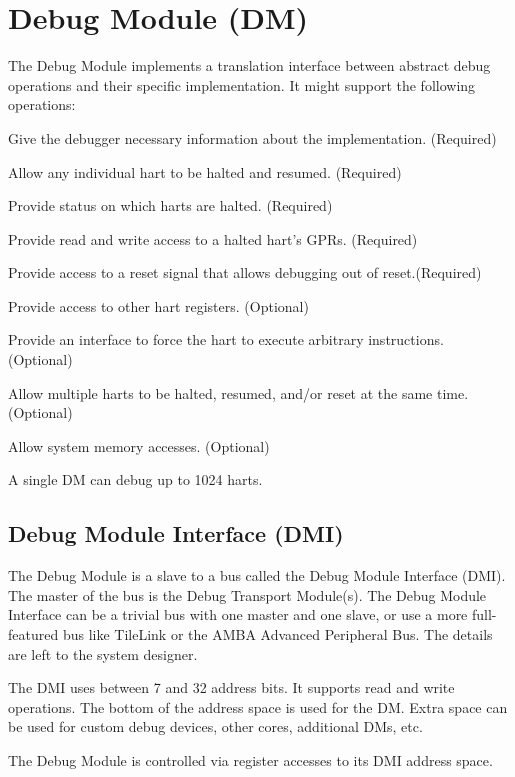 
\chapter{Debug Module (DM)} \label{dm}

\begin{steps}{The Debug Module implements a translation interface between abstract debug
    operations and their specific implementation. It might support the following
    operations:}
\item Give the debugger necessary information about the implementation. (Required)
\item Allow any individual hart to be halted and resumed. (Required)
\item Provide status on which harts are halted. (Required)
\item Provide read and write access to a halted hart's GPRs. (Required)
\item Provide access to a reset signal that allows debugging out of reset.(Required)
\item Provide access to other hart registers. (Optional)
\item Provide an interface to force the hart to execute arbitrary instructions. (Optional)
\item Allow multiple harts to be halted, resumed, and/or reset at the same time. (Optional)
\item Allow system memory accesses. (Optional)
\end{steps}

A single DM can debug up to 1024 harts.

\section{Debug Module Interface (DMI)} \label{dmi}

The Debug Module is a slave to a bus called the Debug Module Interface (DMI). The
master of the bus is the Debug Transport Module(s).
The Debug Module Interface can be a trivial bus with one master and one slave,
or use a more full-featured bus like TileLink or the AMBA Advanced Peripheral
Bus. The details are left to the system designer.

The DMI uses between 7 and 32 address bits.  It supports read and write
operations.  The bottom of the address space is
used for the DM. Extra space can be used for custom debug devices, other cores,
additional DMs, etc.

The Debug Module is controlled via register accesses to its DMI address space.

